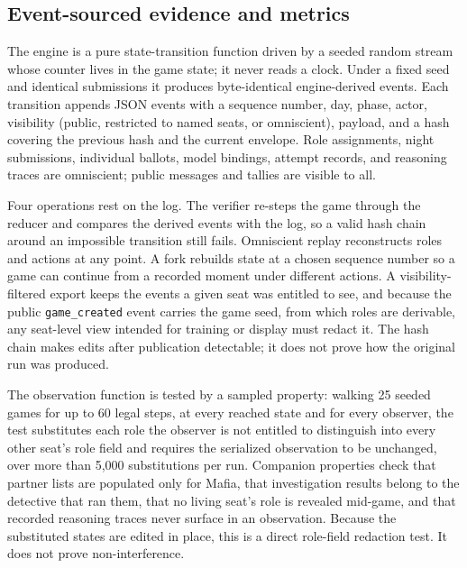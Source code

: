 \documentclass[11pt]{article}
\newcommand{\code}[1]{\texttt{#1}}
\begin{document}
\subsection{Event-sourced evidence and metrics}

The engine is a pure state-transition function driven by a seeded random stream whose counter lives in the game state; it never reads a clock. Under a fixed seed and identical submissions it produces byte-identical engine-derived events. Each transition appends JSON events with a sequence number, day, phase, actor, visibility (public, restricted to named seats, or omniscient), payload, and a hash covering the previous hash and the current envelope. Role assignments, night submissions, individual ballots, model bindings, attempt records, and reasoning traces are omniscient; public messages and tallies are visible to all.

Four operations rest on the log. The verifier re-steps the game through the reducer and compares the derived events with the log, so a valid hash chain around an impossible transition still fails. Omniscient replay reconstructs roles and actions at any point. A fork rebuilds state at a chosen sequence number so a game can continue from a recorded moment under different actions. A visibility-filtered export keeps the events a given seat was entitled to see, and because the public \code{game\_created} event carries the game seed, from which roles are derivable, any seat-level view intended for training or display must redact it. The hash chain makes edits after publication detectable; it does not prove how the original run was produced.

The observation function is tested by a sampled property: walking 25 seeded games for up to 60 legal steps, at every reached state and for every observer, the test substitutes each role the observer is not entitled to distinguish into every other seat's role field and requires the serialized observation to be unchanged, over more than 5,000 substitutions per run. Companion properties check that partner lists are populated only for Mafia, that investigation results belong to the detective that ran them, that no living seat's role is revealed mid-game, and that recorded reasoning traces never surface in an observation. Because the substituted states are edited in place, this is a direct role-field redaction test. It does not prove non-interference.
\end{document}
